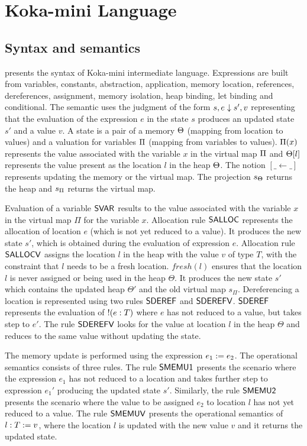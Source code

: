 \section{Koka-mini Language}
\subsection{Syntax and semantics}

 presents the syntax of Koka-mini intermediate language. Expressions are built from variables, constants, abstraction, application, memory location, references, dereferences, assignment, memory isolation, heap binding, let binding and conditional. The semantic uses the judgment of the form $s,e \downarrow s',v$ representing that the evaluation of the expression $e$ in the state $s$ produces an updated state $s'$ and a value $v$.
A state is a pair of a memory $\Theta$ (mapping from location to values) and a valuation for variables $\Pi$ (mapping from variables to values). $\Pi(x)$ represents the value associated with the variable $x$ in the virtual map $\Pi$ and $\Theta[l]$ represents the value present as the location $l$ in the heap $\Theta$. The notion $[\_ \leftarrow \_]$ represents updating the memory or the virtual map. The projection $s_{\Theta}$ returns the heap and $s_{\Pi}$ returns the virtual map.

Evaluation of a variable ${\mathsf{SVAR}}$ results to the value associated with the variable $x$ in the virtual map $\Pi$ for the variable $x$. Allocation rule ${\mathsf{SALLOC}}$ represents the allocation of location $e$ (which is not yet reduced to a value). It produces the new state $s'$, which is obtained during the evaluation of expression $e$. Allocation rule ${\mathsf{SALLOCV}}$ assigns the location $l$ in the heap with the value $v$ of type $T$, with the constraint that $l$ needs to be a fresh location. $fresh(l)$ ensures that the location $l$ is never assigned or being used in the heap $\Theta$. It produces the new state $s'$ which contains the updated heap $\Theta'$ and the old virtual map $s_\Pi$. Dereferencing a location is represented using two rules ${\mathsf{SDEREF}}$ and ${\mathsf{SDEREFV}}$. ${\mathsf{SDEREF}}$ represents the evaluation of $\deref {e} {T}$ where $e$ has not reduced to a value, but takes step to $e'$. The rule ${\mathsf{SDEREFV}}$ looks for the value at location $l$ in the heap $\Theta$ and reduces to the same value without updating the state. 

The memory update is performed using the expression $e_1 :=e_2$. The operational semantics consists of three rules. The rule ${\mathsf{SMEMU1}}$ presents the scenario where the expression $e_1$ has not reduced to a location and takes further step to expression ${e_1'}$ producing the updated state $s'$. Similarly, the rule ${\mathsf{SMEMU2}}$ presents the scenario where the value to be assigned $e_2$ to location $l$ has not yet reduced to a value. The rule ${\mathsf{SMEMUV}}$ presents the operational semantics of ${l : T} :=v$, where the location $l$ is updated with the new value $v$ and it returns the updated state. 

